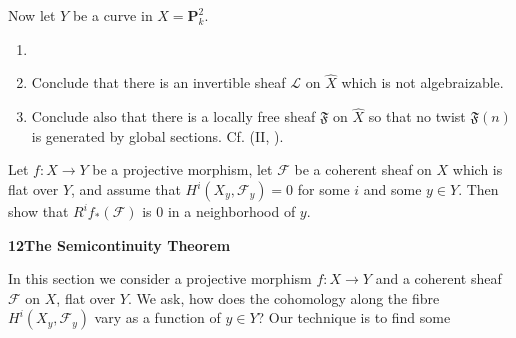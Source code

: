 { Now let $Y$ be a curve in $X=\mathbf P_k^2$.
\begin{enumerate}[label=(\alph*),leftmargin=2.7em,itemsep=0pt,topsep=1pt,parsep=0pt]
\item {}
\item Conclude that there is an invertible sheaf $\mathcal L$ on $\widehat X$ which is not algebraizable.
\item Conclude also that there is a locally free sheaf $\mathfrak F$ on $\widehat X$ so that no twist $\mathfrak F(n)$ is generated by global sections. Cf. (II, ).
\end{enumerate}

 Let $f\colon X\to Y$ be a projective morphism, let $\mathcal F$ be a coherent sheaf on $X$ which is flat over $Y$, and assume that $H^i(X_y,\mathcal F_y)=0$ for some $i$ and some $y\in Y$. Then show that $R^if_*(\mathcal F)$ is $0$ in a neighborhood of $y$.

\par\medskip\noindent\hypertarget{sec-III-12}{}{\large\bfseries 12\enspace The Semicontinuity Theorem}\par\medskip
\noindent In this section we consider a projective morphism $f\colon X\to Y$ and a coherent sheaf $\mathcal F$ on $X$, flat over $Y$. We ask, how does the cohomology along the fibre $H^i(X_y,\mathcal F_y)$ vary as a function of $y\in Y$? Our technique is to find some
}

